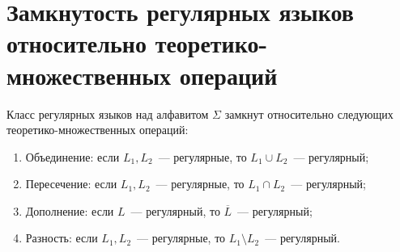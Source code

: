\section{Замкнутость регулярных языков относительно теоретико-множественных операций}
\label{sec:RegularClosureProperties}

\begin{theorem}
    Класс регулярных языков над алфавитом $\Sigma$ замкнут относительно следующих теоретико-множественных операций:
    \begin{enumerate}
        \item Объединение: если $L_1, L_2$~--- регулярные, то $L_1 \cup L_2$~--- регулярный;
        \item Пересечение: если $L_1, L_2$~--- регулярные, то $L_1 \cap L_2$~--- регулярный;
        \item Дополнение: если $L$~--- регулярный, то $\overline{L}$~--- регулярный;
        \item Разность: если $L_1, L_2$~--- регулярные, то $L_1 \setminus L_2$~--- регулярный.
    \end{enumerate}
\end{theorem}

